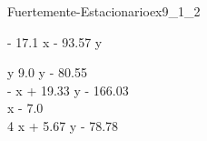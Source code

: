 
\begin{bilevelmodel}{Fuertemente-Estacionario}{ex9_1_2}
    \begin{upperlevel}{- 17.1 x - 93.57 y}{
        
    }
    \end{upperlevel}
    \begin{lowerlevel}{y}{
         9.0 y - 80.55  \\ 
 - x + 19.33 y - 166.03  \\ 
 x - 7.0  \\ 
 4 x + 5.67 y - 78.78 
    }
    \end{lowerlevel}
\end{bilevelmodel}
    
        